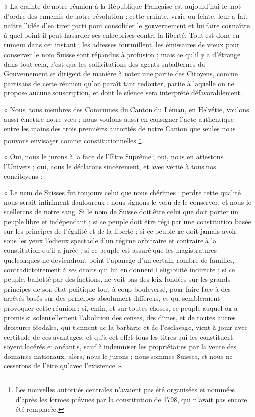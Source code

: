 \documentclass[french,twoside]{book} %
\newenvironment{quoteblock}%
  {\begin{quoting}}
  {\end{quoting}}
\newenvironment{quotebar}{%
    \def\FrameCommand{{\color{rubric!10!}\vrule width 0.5em} \hspace{0.9em}}%
    \def\OuterFrameSep{\itemsep} %
    \MakeFramed {\advance\hsize-\width \FrameRestore}
  }%
  {%
    \endMakeFramed
  }
\renewenvironment{quoteblock}%
  {%
    \savenotes
    \setstretch{0.9}
    \begin{quotebar}
  }
  {%
    \end{quotebar}
    \spewnotes
  }
\begin{document}
\begin{quoteblock}
 \noindent « La crainte de notre réunion à la République Française est aujourd’hui le mot d’ordre des ennemis de notre révolution ; cette crainte, vraie ou feinte, leur a fait naître l’idée d’en tirer parti pour consolider le gouvernement et lui faire connaître à quel point il peut hasarder ses entreprises contre la liberté. Tout est donc en rumeur dans cet instant ; les adresses fourmillent, les émissaires de vœux pour conserver le nom Suisse sont répandus à profusion ; mais ce qu’il y a d’étrange dans tout cela, c’est que les sollicitations des agents subalternes du Gouvernement se dirigent de manière à noter une partie des Citoyens, comme partisans de cette réunion qu’on paraît tant redouter, partie à laquelle on ne propose aucune souscription, et dont le silence sera interprété défavorablement.\par
 « Nous, tous membres des Communes du Canton du Léman, en Helvétie, voulons aussi émettre notre vœu ; nous voulons aussi en consigner l’acte authentique entre les mains des trois premières autorités de notre Canton que seules nous pouvons envisager comme constitutionnelles \footnote{Les nouvelles autorités centrales n’avaient pas été organisées et nommées d’après les formes prévues par la constitution de 1798, qui n’avait pas encore été remplacée.}.\par
 « Oui, nous le jurons à la face de l’Être Suprême ; oui, nous en attestons l’Univers ; oui, nous le déclarons sincèrement, et avec vérité à tous nos concitoyens :\par
 « Le nom de Suisses fut toujours celui que nous chérîmes ; perdre cette qualité nous serait infiniment douloureux ; nous signons le vœu de le conserver, et nous le scellerons de notre sang. Si le nom de Suisse doit être celui que doit porter un peuple libre et indépendant ; si ce peuple doit être régi par une constitution basée sur les principes de l’égalité et de la liberté ; si ce peuple ne doit jamais avoir sous les yeux l’odieux spectacle d’un régime arbitraire et contraire à la constitution qu’il a jurée ; si ce peuple est assuré que les magistratures quelconques ne deviendront point l’apanage d’un certain nombre de familles, contradictoirement à ses droits qui lui en donnent l’éligibilité indirecte ; si ce peuple, ballotté par des factions, ne voit pas des loix fondées sur les grands principes de son état politique tout à coup bouleversé, pour faire face à des arrêtés basés sur des principes absolument differens, et qui sembleraient provoquer cette réunion ; si, enfin, et sur toutes choses, ce peuple auquel on a promis si solennellement l’abolition des censes, des dîmes, et de toutes autres droitures féodales, qui tiennent de la barbarie et de l’esclavage, vient à jouir avec certitude de ces avantages, et qu’à cet effet tous les titres qui les constituent soyent lacérés et anéantis, sauf à indemniser les propriétaires par la vente des domaines nationaux, alors, nous le jurons ; nous sommes Suisses, et nous ne cesserons de l’être qu’avec l’existence ».
 \end{quoteblock}
\end{document}
